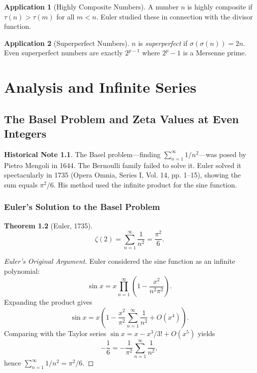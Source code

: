 \documentclass[11pt,a4paper,twoside]{book}
\theoremstyle{eulerstyle}
\newtheorem{theorem}{Theorem}[chapter]
\theoremstyle{definition}
\newtheorem{historical}[theorem]{Historical Note}
\newtheorem{application}[theorem]{Application}
\begin{document}
\begin{application}[Highly Composite Numbers]
A number $n$ is highly composite if $\tau(n) > \tau(m)$ for all $m < n$. Euler studied these in connection with the divisor function.
\end{application}

\begin{application}[Superperfect Numbers]
$n$ is \emph{superperfect} if $\sigma(\sigma(n)) = 2n$. Even superperfect numbers are exactly $2^{p-1}$ where $2^p - 1$ is a Mersenne prime.
\end{application}

\cleardoublepage

\part{Analysis and Infinite Series}
\label{part:analysis}

\chapter{The Basel Problem and Zeta Values at Even Integers}
\label{ch:basel}

\begin{historical}
The Basel problem---finding $\sum_{n=1}^\infty 1/n^2$---was posed by Pietro Mengoli in 1644. The Bernoulli family failed to solve it. Euler solved it spectacularly in 1735 (Opera Omnia, Series I, Vol. 14, pp. 1--15), showing the sum equals $\pi^2/6$. His method used the infinite product for the sine function.
\end{historical}

\section{Euler's Solution to the Basel Problem}

\begin{theorem}[Euler, 1735]
\[
\zeta(2) = \sum_{n=1}^\infty \frac{1}{n^2} = \frac{\pi^2}{6}.
\]
\end{theorem}

\begin{proof}[Euler's Original Argument]
Euler considered the sine function as an infinite polynomial:
\[
\sin x = x \prod_{n=1}^\infty \left(1 - \frac{x^2}{n^2 \pi^2}\right).
\]
Expanding the product gives
\[
\sin x = x \left(1 - \frac{x^2}{\pi^2}\sum_{n=1}^\infty \frac{1}{n^2} + O(x^4)\right).
\]
Comparing with the Taylor series $\sin x = x - x^3/3! + O(x^5)$ yields
\[
-\frac{1}{6} = -\frac{1}{\pi^2} \sum_{n=1}^\infty \frac{1}{n^2},
\]
hence $\sum_{n=1}^\infty 1/n^2 = \pi^2/6$.
\end{proof}
\end{document}
